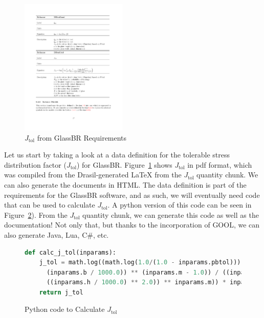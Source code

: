 \documentclass[sigconf]{acmart}
\newcommand{\jtol}{$J_{\mbox{tol}}$}
\begin{document}

\begin{figure}
\begin{center}
\includegraphics[width=0.45\textwidth]{./figures/Jtol_pdf.pdf}
\end{center}
\caption{\jtol{} from GlassBR Requirements}
\label{Fig_Jtolpdf}
\end{figure}

Let us start by taking a look at a data definition for the tolerable stress
distribution factor (\jtol{}) for GlassBR. Figure~\ref{Fig_Jtolpdf} shows
\jtol{} in pdf format, which was compiled from the Drasil-generated LaTeX from
the \jtol{} quantity chunk. We can also generate the documents in HTML. The data
definition is part of the requirements for the GlassBR software, and as such, we
will eventually need code that can be used to calculate \jtol{}.  A python
version of this code can be seen in Figure~\ref{Fig_JtolPython}). From the
\jtol{} quantity chunk, we can generate this code as well as the documentation!
Not only that, but thanks to the incorporation of GOOL, we can also generate
Java, Lua, C\#, etc.

\begin{figure}
\begin{lstlisting}[language=python, frame=single, showstringspaces=false]
def calc_j_tol(inparams):
    j_tol = math.log((math.log(1.0/(1.0 - inparams.pbtol))) * ((((inparams.a / 1000.0) * 
      (inparams.b / 1000.0)) ** (inparams.m - 1.0)) / ((inparams.k * (((inparams.E * 1000.0) * 
      ((inparams.h / 1000.0) ** 2.0)) ** inparams.m)) * inparams.ldf))) 
    return j_tol
\end{lstlisting}
\caption{Python code to Calculate \jtol{}}
\label{Fig_JtolPython}
\end{figure}
\end{document}
